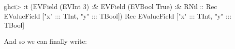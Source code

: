 \documentclass[]{article}
\newenvironment{Shaded}{}{}
\newcommand{\DataTypeTok}[1]{\textcolor[rgb]{0.56,0.13,0.00}{#1}}
\newcommand{\DecValTok}[1]{\textcolor[rgb]{0.25,0.63,0.44}{#1}}
\newcommand{\NormalTok}[1]{#1}
\newcommand{\OperatorTok}[1]{\textcolor[rgb]{0.40,0.40,0.40}{#1}}
\newcommand{\OtherTok}[1]{\textcolor[rgb]{0.00,0.44,0.13}{#1}}
\newcommand{\StringTok}[1]{\textcolor[rgb]{0.25,0.44,0.63}{#1}}
\begin{document}
\begin{Shaded}
\begin{Highlighting}[]
\NormalTok{ghci}\OperatorTok{\textgreater{}} \OperatorTok{:}\NormalTok{t (}\DataTypeTok{EVField}\NormalTok{ (}\DataTypeTok{EVInt} \DecValTok{3}\NormalTok{) }\OperatorTok{:\&} \DataTypeTok{EVField}\NormalTok{ (}\DataTypeTok{EVBool} \DataTypeTok{True}\NormalTok{) }\OperatorTok{:\&} \DataTypeTok{RNil}\OtherTok{ ::} \DataTypeTok{Rec} \DataTypeTok{EValueField}\NormalTok{ [}\StringTok{"x"} \OperatorTok{:::} \DataTypeTok{TInt}\NormalTok{, }\StringTok{"y"} \OperatorTok{:::} \DataTypeTok{TBool}\NormalTok{])}
\DataTypeTok{Rec} \DataTypeTok{EValueField}\NormalTok{ [}\StringTok{"x"} \OperatorTok{:::} \DataTypeTok{TInt}\NormalTok{, }\StringTok{"y"} \OperatorTok{:::} \DataTypeTok{TBool}\NormalTok{]}
\end{Highlighting}
\end{Shaded}

And so we can finally write:
\end{document}
